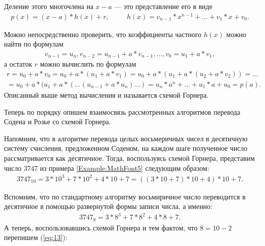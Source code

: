 \documentclass[14pt, russian]{scrartcl}
\begin{document}
Деление этого многочлена на $x - a$ — это представление его в виде 
\label{Example:MathFont9} 
\begin{equation*}\label{eq:9}
\begin{aligned}
p(x) = (x - a) * h(x) + r,\,\,\,\qquad
h(x) = v_{n-1} * x^{n-1} + ... + v_1 * x + v_0.
\end{aligned}
\end{equation*}

Можно непосредственно проверить, что коэффициенты частного $h(x)$ можно найти по формулам 
\label{Example:MathFont10} 
\begin{equation*}\label{eq:10}
\begin{aligned}
v_{n-1} = u_n, v_{n-2} = u_{n-1} + a * v_{n-1}, ..., v_0 = u_1 + a* v_1, 
\end{aligned}
\end{equation*}
а остаток $r$ можно вычислить по формулам
\label{Example:MathFont11} 
\begin{equation*}\label{eq:11}
\begin{aligned}
r = u_0 + a*v_0 = u_0 + a*(u_1 + a*v_1) = u_0 + a*(u_1 + a*(u_2 + a*v_2)) = ... \\
= u_0 + a*(u_1+a*(...(u_{n-1}+a*u_n)...) = u_n*a^n+...+u_1*a+u_0 = p(a).
\end{aligned}
\end{equation*}
Описанный выше метод вычисления и называется схемой Горнера.

Теперь по порядку опишем взаимосвязь рассмотренных алгоритмов перевода Содена и Розье со схемой Горнера. 

Напомним, что в алгоритме перевода целых восьмеричных чисел в десятичную систему счисления, предложенном Соденом, на каждом шаге полученное число рассматривается как десятичное. Тогда, воспользуясь схемой Горнера, представим число 3747 из примера \ref{Example:MathFont5} следующим образом:
\label{Example:MathFont12} 
\begin{equation*}\label{eq:12}
\begin{aligned}
3747_{10} = 3 * 10^3 + 7 * 10^2 + 4 * 10 + 7 = ((3 * 10 + 7)*10 + 4) * 10 + 7. 
\end{aligned}
\end{equation*}

Вспомним, что по стандартному алгоритму восьмиричное число переводится в десятичное в помощью развернутой формы записи числа, а именно:
\label{Example:MathFont13} 
\begin{equation}\label{eq:13}
\begin{aligned}
3747_8 = 3 * 8^3 + 7 * 8^2 + 4 * 8 + 7. 
\end{aligned}
\end{equation}
А теперь, воспользовавшись схемой Горнера и тем фактом, что $8=10-2$ перепишем (\ref{eq:13}):
\end{document}
